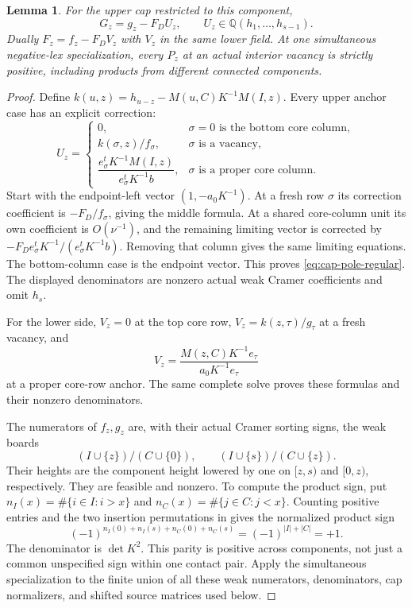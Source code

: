 \documentclass[11pt,a4paper]{amsart}
\numberwithin{equation}{section}
\theoremstyle{plain}
\newtheorem{lemma}[theorem]{Lemma}
\theoremstyle{definition}
\newcommand{\Q}{\mathbb Q}
\begin{document}
\begin{lemma}\label{lem:local-forcing}
For the upper cap restricted to this component,
\begin{equation}\label{eq:cap-pole-regular}
 G_z=g_z-F_DU_z,\qquad U_z\in\Q(h_1,\ldots,h_{s-1}).
\end{equation}
Dually \(F_z=f_z-F_DV_z\) with \(V_z\) in the same lower field.  At one simultaneous negative-lex specialization, every \(P_z\) at an actual interior vacancy is strictly positive, including products from different connected components.
\end{lemma}
\begin{proof}
Define \(k(u,z)=h_{u-z}-M(u,C)K^{-1}M(I,z)\).  Every upper anchor case has an explicit correction:
\[
 U_z=\begin{cases}
 0,&\sigma=0\text{ is the bottom core column},\\
 k(\sigma,z)/f_\sigma,&\sigma\text{ is a vacancy},\\
 \dfrac{e_\sigma^tK^{-1}M(I,z)}{e_\sigma^tK^{-1}b},
 &\sigma\text{ is a proper core column}.
 \end{cases}
\]
Start with the endpoint-left vector \((1,-a_0K^{-1})\).  At a fresh row \(\sigma\) its correction coefficient is \(-F_D/f_\sigma\), giving the middle formula.  At a shared core-column unit its own coefficient is \(O(\nu^{-1})\), and the remaining limiting vector is corrected by \(-F_D e_\sigma^tK^{-1}/(e_\sigma^tK^{-1}b)\).  Removing that column gives the same limiting equations.  The bottom-column case is the endpoint vector.  This proves \eqref{eq:cap-pole-regular}.  The displayed denominators are nonzero actual weak Cramer coefficients and omit \(h_s\).

For the lower side, \(V_z=0\) at the top core row, \(V_z=k(z,\tau)/g_\tau\) at a fresh vacancy, and
\[
 V_z=\frac{M(z,C)K^{-1}e_\tau}{a_0K^{-1}e_\tau}
\]
at a proper core-row anchor.  The same complete solve proves these formulas and their nonzero denominators.

The numerators of \(f_z,g_z\) are, with their actual Cramer sorting signs, the weak boards
\[
 (I\cup\{z\})/(C\cup\{0\}),\qquad
 (I\cup\{s\})/(C\cup\{z\}).
\]
Their heights are the component height lowered by one on \([z,s)\) and \([0,z)\), respectively.  They are feasible and nonzero.  To compute the product sign, put \(n_I(x)=\#\{i\in I:i>x\}\) and \(n_C(x)=\#\{j\in C:j<x\}\).  Counting positive entries and the two insertion permutations in  gives the normalized product sign
\[
 (-1)^{n_I(0)+n_I(s)+n_C(0)+n_C(s)}=(-1)^{|I|+|C|}=+1.
\]
The denominator is \(\det K^2\).  This parity is positive across components, not just a common unspecified sign within one contact pair.  Apply the simultaneous specialization to the finite union of all these weak numerators, denominators, cap normalizers, and shifted source matrices used below.
\end{proof}
\end{document}
